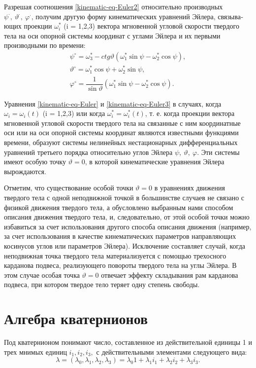 \documentclass[14pt]{extreport}
\renewcommand{\phi}{\varphi} %
\begin{document}
Разрешая соотношения \eqref{kinematic-eq-Euler2} относительно производных $\psi^{\cdot},\ \vartheta^{\cdot},\ \phi^{\cdot}$, получим другую форму кинематических уравнений Эйлера, связыва­ющих проекции $\omega_{i}^{*}$ (i = 1,2,3) вектора мгновенной угловой скорости твердого тела на оси опорной системы координат с углами Эйлера и их первыми производными по времени:
\begin{equation}
\label{kinematic-eq-Euler3}
\begin{split}
\psi^{\circ}=\omega_3^{*}-ctg\vartheta(\omega_1^{*}\sin\psi-\omega_2^{*}\cos\psi),\\
\vartheta^{\circ}=\omega_1^{*}\cos\psi+\omega_2^{*}\sin\psi,\\
\phi^{\circ}=\dfrac{1}{\sin\vartheta}(\omega_1^{*}\sin\psi-\omega_2^{*}\cos\psi).
\end{split}
\end{equation}

Уравнения \eqref{kinematic-eq-Euler} и \eqref{kinematic-eq-Euler3} в случаях, когда $\omega_{i}=\omega_{i}(t)$ (i = 1,2,3) или когда $\omega_{i}^{*}=\omega_{i}^{*}(t)$, т. е. когда проекции вектора мгновенной угловой скорости твердого тела на связанные с ним координатные оси или на оси опорной системы координат являются известными функциями времени, образуют системы нелинейных нестационарных дифференци­альных уравнений третьего порядка относительно углов Эйлера $\psi,\ \vartheta,\ \phi$. Эти системы имеют особую точку $\vartheta=0$, в которой кинематические уравнения Эйлера вырождаются.

Отметим, что существование особой точки $\vartheta=0$ в уравнениях движения твердого тела с одной неподвижной точкой в большинстве случаев не связано с физикой движения твердого тела, а обуслов­лено выбранным нами способом описания движения твердого тела, и, следовательно, от этой особой точки можно избавиться за счет использования другого способа описания движения (например, за счет использования в качестве кинематических параметров направляющих косинусов углов или параметров Эйлера). Исключение составляет слу­чай, когда неподвижная точка твердого тела материализуется с помо­щью трехосного карданова подвеса, реализующего повороты твердого тела на углы Эйлера. В этом случае особая точка $\vartheta=0$ отвечает эффекту складывания рам карданова подвеса, при котором твердое тело теряет одну степень свободы.

\chapter{Алгебра кватернионов}
Под кватернионом понимают число, составленное из действительной единицы 1 и трех мнимых единиц $i_{1}, i_{2}, i_{3},$ с действительными элементами следующего вида:
\begin{equation}
\label{quaternion-def}
\lambda = (\lambda_{0}, \lambda_{1}, \lambda_{2}, \lambda_{3}) = \lambda_{0} 1 + \lambda_{1} i_{1} + \lambda_{2} i_{2} + \lambda_{3} i_{3}.
\end{equation}
\end{document}
